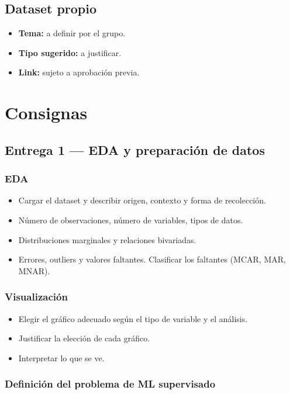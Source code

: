\documentclass[12pt]{article}
\begin{document}
\subsection{Dataset propio}
\begin{itemize}
    \item \textbf{Tema:} a definir por el grupo.
    \item \textbf{Tipo sugerido:} a justificar.
    \item \textbf{Link:} sujeto a aprobación previa.
\end{itemize}

\section{Consignas}

\subsection{Entrega 1 --- EDA y preparación de datos}

\subsubsection{EDA}

\begin{itemize}
    \item Cargar el dataset y describir origen, contexto y forma de recolección.
    \item Número de observaciones, número de variables, tipos de datos.
    \item Distribuciones marginales y relaciones bivariadas.
    \item Errores, outliers y valores faltantes. Clasificar los faltantes (MCAR, MAR, MNAR).
\end{itemize}

\subsubsection{Visualización}

\begin{itemize}
    \item Elegir el gráfico adecuado según el tipo de variable y el análisis.
    \item Justificar la elección de cada gráfico.
    \item Interpretar lo que se ve.
\end{itemize}

\subsubsection{Definición del problema de ML supervisado}
\end{document}

